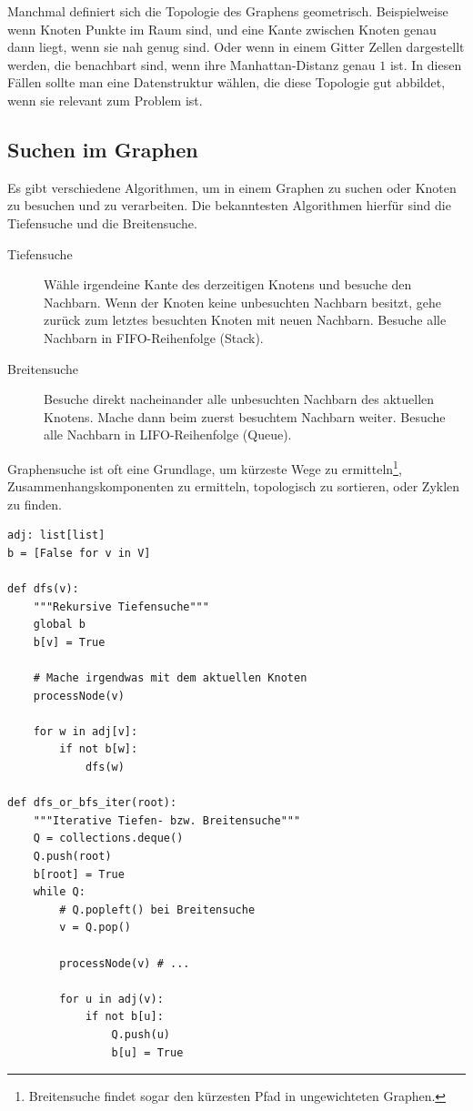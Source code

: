 Manchmal definiert sich die Topologie des Graphens geometrisch.
Beispielweise wenn Knoten Punkte im Raum sind, und eine Kante zwischen Knoten genau dann liegt, wenn sie nah genug sind.
Oder wenn in einem Gitter Zellen dargestellt werden, die benachbart sind, wenn ihre Manhattan-Distanz genau \(1\) ist.
In diesen Fällen sollte man eine Datenstruktur wählen, die diese Topologie gut abbildet, wenn sie relevant zum Problem ist.

\subsection{Suchen im Graphen}
Es gibt verschiedene Algorithmen, um in einem Graphen zu suchen oder Knoten zu besuchen und zu verarbeiten.
Die bekanntesten Algorithmen hierfür sind die Tiefensuche und die Breitensuche.
\begin{description}
    \item[Tiefensuche] Wähle irgendeine Kante des derzeitigen Knotens und besuche den Nachbarn.
        Wenn der Knoten keine unbesuchten Nachbarn besitzt, gehe zurück zum letztes besuchten Knoten mit neuen Nachbarn.
        Besuche alle Nachbarn in FIFO-Reihenfolge (Stack).

    \item[Breitensuche] Besuche direkt nacheinander alle unbesuchten Nachbarn des aktuellen Knotens.
        Mache dann beim zuerst besuchtem Nachbarn weiter.
        Besuche alle Nachbarn in LIFO-Reihenfolge (Queue).
\end{description}
Graphensuche ist oft eine Grundlage, um kürzeste Wege zu ermitteln\footnote{Breitensuche findet sogar den kürzesten Pfad in ungewichteten Graphen.}, Zusammenhangskomponenten zu ermitteln, topologisch zu sortieren, oder Zyklen zu finden.
\begin{lstlisting}
adj: list[list]
b = [False for v in V]

def dfs(v):
    """Rekursive Tiefensuche"""
    global b
    b[v] = True

    # Mache irgendwas mit dem aktuellen Knoten
    processNode(v)

    for w in adj[v]:
        if not b[w]:
            dfs(w)

def dfs_or_bfs_iter(root):
    """Iterative Tiefen- bzw. Breitensuche"""
    Q = collections.deque()
    Q.push(root)
    b[root] = True
    while Q:
        # Q.popleft() bei Breitensuche
        v = Q.pop()

        processNode(v) # ...

        for u in adj(v):
            if not b[u]:
                Q.push(u)
                b[u] = True
\end{lstlisting}

